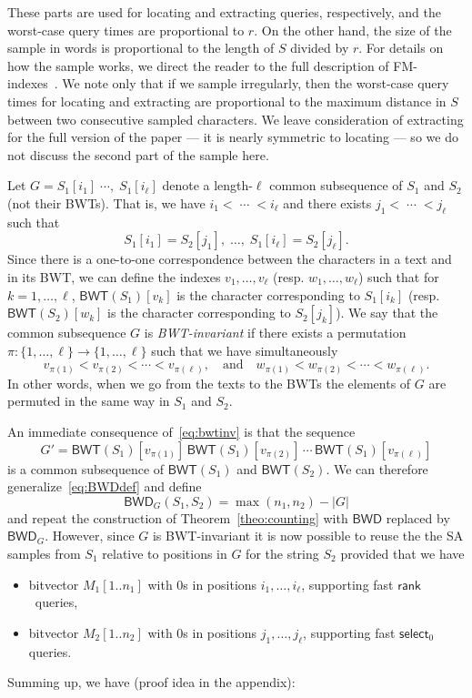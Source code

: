 \documentclass{llncs}
\newcommand{\BWD}
  {\ensuremath{\mathsf{BWD}}}
\newcommand{\BWT}
  {\ensuremath{\mathsf{BWT}}}
\newcommand{\rank}
  {\ensuremath{\mathsf{rank}}}
\newcommand{\select}
  {\ensuremath{\mathsf{select}}}
\begin{document}
These parts are used for locating and extracting queries, respectively, and
the worst-case query times are proportional to $r$.  On the other hand, the
size of the sample in words is proportional to the length of $S$ divided by
$r$.  For details on how the sample works, we direct the reader to the full
description of FM-indexes~\cite{FM05}.  We note only that if we sample
irregularly, then the worst-case query times for locating and extracting are
proportional to the maximum distance in $S$ between two consecutive sampled
characters.  We leave consideration of extracting for the full version of the
paper --- it is nearly symmetric to locating --- so we do not discuss the
second part of the sample here.

Let
\(G = S_1[i_1]\;\cdots,\;S_1[i_\ell]\)
denote a length-$\ell$ common subsequence of $S_1$ and $S_2$ (not their
BWTs). That is, we have $i_1< \;\cdots\; < i_\ell$ and there exists $j_1 <
\;\cdots\; < j_\ell$ such that
$$
S_1[i_1]=S_2[j_1],\;\ldots,\;S_1[i_\ell]=S_2[j_\ell].
$$
Since there is a one-to-one correspondence between the characters in a text and in its BWT, we can
define the indexes $v_1, \ldots, v_\ell$ (resp. $w_1,\ldots,w_\ell$) such
that for $k=1,\ldots,\ell$, $\BWT(S_1)[v_k]$ is the character corresponding
to $S_1[i_k]$ (resp. $\BWT(S_2)[w_k]$ is the character corresponding to
$S_2[j_k]$). We say that the common subsequence $G$ is {\em BWT-invariant} if
there exists a permutation $\pi: \{1,\ldots,\ell\} \rightarrow
\{1,\ldots,\ell\}$ such that we have simultaneously
\begin{equation}\label{eq:bwtinv}
v_{\pi(1)} < v_{\pi(2)} < \cdots < v_{\pi(\ell)}, \quad\mbox{and}\quad
w_{\pi(1)} < w_{\pi(2)} < \cdots < w_{\pi(\ell)}.
\end{equation}
In other words, when we go from the texts to the BWTs the elements of $G$ are
permuted in the same way in $S_1$ and $S_2$.




An immediate consequence of~\eqref{eq:bwtinv} is that the sequence
$$
G' = \BWT(S_1)[v_{\pi(1)}]\,\BWT(S_1)[v_{\pi(2)}]\,\cdots\,\BWT(S_1)[v_{\pi(\ell)}]
$$
is a common subsequence of $\BWT(S_1)$ and $\BWT(S_2)$. We can therefore
generalize~\eqref{eq:BWDdef} and define
$$
\BWD_G(S_1, S_2) = \max(n_1,n_2) - |G|
$$
and repeat the construction of Theorem~\ref{theo:counting} with $\BWD$
replaced by $\BWD_G$. However, since $G$ is BWT-invariant it is now possible
to reuse the the SA samples from $S_1$ relative to positions in $G$ for the
string $S_2$ provided that we have
\begin{itemize}
\item bitvector \(M_1 [1..n_1]\) with 0s in positions  $i_1, \ldots, i_\ell$,
    supporting fast \rank\ queries,
\item bitvector \(M_2 [1..n_2]\) with 0s in positions $j_1, \ldots,
    j_\ell$, supporting fast $\select_0$ queries.
\end{itemize}
Summing up, we have (proof idea in the appendix):
\end{document}
